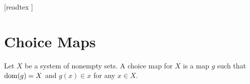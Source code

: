 \documentclass[10pt]{article}
\begin{document}
  \begin{imports}
    \begin{forthel}
      [readtex ]
    \end{forthel}
  \end{imports}


  \section*{Choice Maps}

  \begin{forthel}
    \begin{definition}
      Let $X$ be a system of nonempty sets.
      A choice map for $X$ is a map $g$ such that $\operatorname{dom}(g) = X$ and $g(x) \in x$ for any $x \in X$.
    \end{definition}
  \end{forthel}
\end{document}
